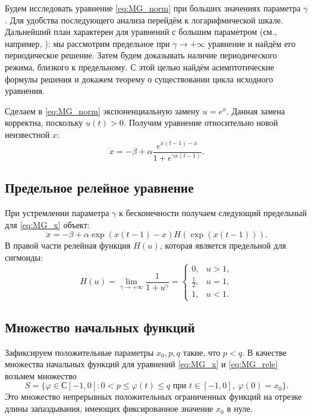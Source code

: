 Будем исследовать уравнение \eqref{eq:MG_norm} при больших значениях параметра $\gamma$. Для удобства последующего анализа перейдём к логарифмической шкале. Дальнейший план характерен для уравнений с большим параметром (см., например, \cite{Kolesov2010}): мы рассмотрим предельное при $\gamma\to+\infty$ уравнение и найдём его периодическое решение. Затем будем доказывать наличие периодического режима, близкого к предельному. С этой целью найдём асимптотические формулы решения и докажем теорему о существовании цикла исходного уравнения.

Сделаем в \eqref{eq:MG_norm} экспоненциальную замену $u=e^x$. Данная замена корректна, поскольку $u(t) > 0$. Получим уравнение относительно новой неизвестной $x$:
\begin{equation}
    \label{eq:MG_x}
    \dot{x}=-\beta+\alpha\frac{e^{x(t-1)-x}}{1+e^{\gamma x(t-1)}}.
\end{equation}

\subsection{Предельное релейное уравнение}
При устремлении параметра $\gamma$ к бесконечности получаем следующий предельный для \eqref{eq:MG_x} объект:
\begin{equation}
    \label{eq:MG_rele}
    \dot{x}=-\beta + \alpha \exp({x(t-1)-x})H(\exp({x(t-1)})).
\end{equation}
В правой части релейная функция $H(u)$, которая является предельной для сигмоиды:
\begin{equation}
    \label{eq:H}
    H(u)=\lim\limits_{\gamma\to +\infty}\frac{1}{1+u^{\gamma}}=
    \begin{cases}
        0, & u > 1,\\
        \frac{1}{2}, & u = 1,\\
        1, & u < 1.
    \end{cases}
\end{equation}

\subsection{Множество начальных функций}
Зафиксируем положительные параметры $x_0, p, q$ такие, что $p < q$. В качестве множества начальных функций для уравнений \eqref{eq:MG_x} и \eqref{eq:MG_rele} возьмем множество
\begin{equation}
    \label{eq:init_set}
    S=\{\varphi\in С[-1,0]: 0 < p \leqslant \varphi(t)\leqslant q \text{ при } t\in[-1,0],\ \varphi(0)=x_0\}.
\end{equation}
Это множество непрерывных положительных ограниченных функций на отрезке длины запаздывания, имеющих фиксированное значение $x_0$ в нуле.

